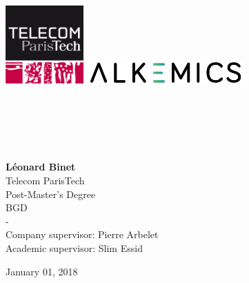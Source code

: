 
\begin{titlepage}

\begin{center}

\begin{center}
    \includegraphics[height=3cm]{images/logos/logo-telecom-paristech.png}
    \includegraphics[width=6cm]{images/logos/Logo-Alkemics.png}
\end{center}

\vspace{160pt}

\textsc{\Large \reportsubject}\\[0.5cm]
\HRule \\[0.4cm]
{\huge \bfseries \reporttitle}\\[0.4cm]
\HRule \\[1.5cm]

\vspace{50pt}

 \large{\textbf{Léonard Binet} \\ Telecom ParisTech \\ Post-Master's Degree \\ BGD \\ \vspace{0.25cm} - \vspace{0.25cm} \\
  Company supervisor: Pierre Arbelet \\ Academic supervisor: Slim Essid}

\vfill

{\large January 01, 2018}

\end{center}

\end{titlepage}
